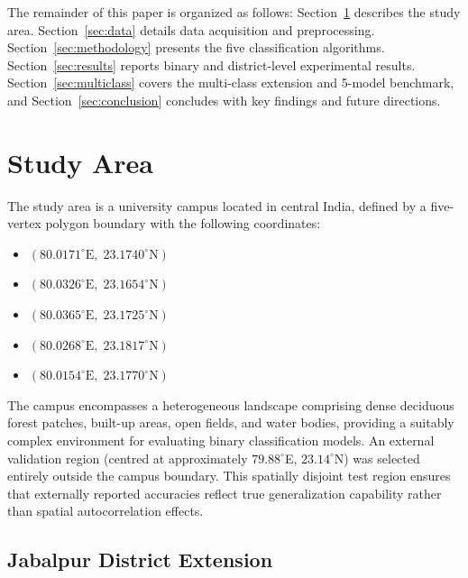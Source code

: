 \documentclass[12pt, a4paper, twocolumn]{article}
\begin{document}
The remainder of this paper is organized as follows: Section~\ref{sec:study_area} describes the study area. Section~\ref{sec:data} details data acquisition and preprocessing.
Section~\ref{sec:methodology} presents the five classification algorithms. Section~\ref{sec:results} reports binary and district-level experimental results.
Section~\ref{sec:multiclass} covers the multi-class extension and 5-model benchmark, and Section~\ref{sec:conclusion} concludes with key findings and future directions.

\section{Study Area}
\label{sec:study_area}

The study area is a university campus located in central India, defined by a five-vertex polygon boundary with the following coordinates:

\begin{itemize}
    \item $(80.0171^{\circ}\text{E},\; 23.1740^{\circ}\text{N})$
    \item $(80.0326^{\circ}\text{E},\; 23.1654^{\circ}\text{N})$
    \item $(80.0365^{\circ}\text{E},\; 23.1725^{\circ}\text{N})$
    \item $(80.0268^{\circ}\text{E},\; 23.1817^{\circ}\text{N})$
    \item $(80.0154^{\circ}\text{E},\; 23.1770^{\circ}\text{N})$
\end{itemize}

The campus encompasses a heterogeneous landscape comprising dense deciduous forest patches, built-up areas, open fields, and water bodies, providing a suitably complex environment for evaluating binary classification models.
An external validation region (centred at approximately $79.88^{\circ}$E, $23.14^{\circ}$N) was selected entirely outside the campus boundary.
This spatially disjoint test region ensures that externally reported accuracies reflect true generalization capability rather than spatial autocorrelation effects.

\subsection{Jabalpur District Extension}
\label{subsec:jabalpur}
\end{document}

